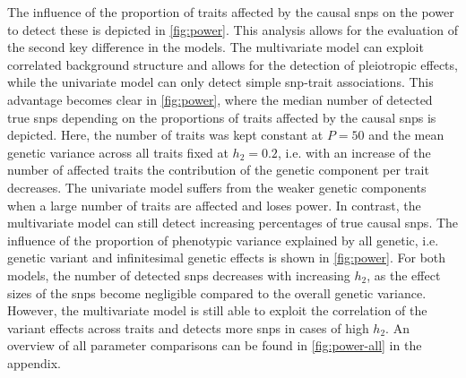 The influence of the proportion of traits affected by the causal \glspl{snp} on the power to detect these is depicted in \cref{fig:power}. This analysis allows for the evaluation of the second key difference in the models. The multivariate model can exploit correlated background structure and allows for the detection of pleiotropic effects, while the univariate model can only detect simple \gls{snp}-trait associations. This advantage becomes clear in \cref{fig:power}, where the median number of detected true \glspl{snp} depending on the proportions of traits affected by the causal \glspl{snp} is depicted. Here, the number of traits was kept constant at \(P=50\) and the mean genetic variance across all traits fixed at \(h_2=0.2\), i.e. with an increase of the number of affected traits the contribution of the genetic component per trait decreases. The univariate model suffers from the weaker genetic components when a large number of traits are affected and loses power. In contrast, the multivariate model can still detect increasing percentages of true causal \glspl{snp}. The influence of the proportion of phenotypic variance explained by all genetic, i.e. genetic variant and infinitesimal genetic effects is shown in \cref{fig:power}. For both models, the number of detected \glspl{snp} decreases with increasing \(h_2\), as the effect sizes of the \glspl{snp} become negligible compared to the overall genetic variance. However, the multivariate model is still able to exploit the correlation of the variant effects across traits and detects more \glspl{snp} in cases of high \(h_2\). An overview of all parameter comparisons can be found in \cref{fig:power-all} in the appendix. 
 